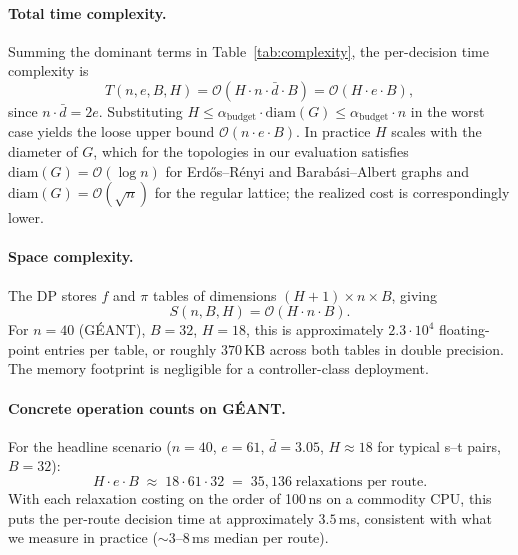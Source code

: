 \paragraph{Total time complexity.}
Summing the dominant terms in Table~\ref{tab:complexity}, the
per-decision time complexity is
\begin{equation}
T(n, e, B, H) = \mathcal{O}\!\left(H \cdot n \cdot \bar{d} \cdot B\right)
              = \mathcal{O}\!\left(H \cdot e \cdot B\right),
\label{eq:time-complexity}
\end{equation}
since $n \cdot \bar{d} = 2e$. Substituting
$H \le \alpha_{\text{budget}} \cdot \mathrm{diam}(G) \le
\alpha_{\text{budget}} \cdot n$ in the worst case yields the
loose upper bound $\mathcal{O}(n \cdot e \cdot B)$. In practice
$H$ scales with the diameter of $G$, which for the topologies in
our evaluation satisfies $\mathrm{diam}(G) = \mathcal{O}(\log n)$
for Erd\H{o}s--R\'enyi and Barab\'asi--Albert graphs and
$\mathrm{diam}(G) = \mathcal{O}(\sqrt{n})$ for the regular
lattice; the realized cost is correspondingly lower.

\paragraph{Space complexity.}
The DP stores $f$ and $\pi$ tables of dimensions
$(H+1) \times n \times B$, giving
\begin{equation}
S(n, B, H) = \mathcal{O}(H \cdot n \cdot B).
\label{eq:space-complexity}
\end{equation}
For $n = 40$ (GÉANT), $B = 32$, $H = 18$, this is approximately
$2.3 \cdot 10^4$ floating-point entries per table, or roughly
$370\,$KB across both tables in double precision. The memory
footprint is negligible for a controller-class deployment.

\paragraph{Concrete operation counts on GÉANT.}
For the headline scenario ($n = 40$, $e = 61$, $\bar{d} = 3.05$,
$H \approx 18$ for typical s--t pairs, $B = 32$):
\[
H \cdot e \cdot B \;\approx\; 18 \cdot 61 \cdot 32
                          \;=\; 35{,}136 \;\text{relaxations per
route}.
\]
With each relaxation costing on the order of 100\,ns on a
commodity CPU, this puts the per-route decision time at
approximately $3.5$\,ms, consistent with what we measure in
practice ($\sim$$3$--$8$\,ms median per route).

